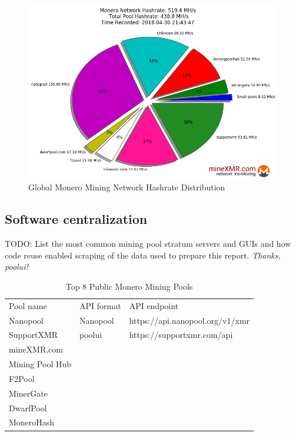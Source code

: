 \documentclass[notitlepage]{report}
\begin{document}
\begin{figure}[h]
\centering
\includegraphics[width=\textwidth]{global-monero-mining-network-hashrate-distribution-2018-04-30}
\captionsetup{labelformat=empty}
\caption{Global Monero Mining Network Hashrate Distribution}
\label{fig:hashrate-distribution}
\end{figure}

\subsection{Software centralization}

TODO: List the most common mining pool stratum servers and GUIs and how code reuse enabled scraping of the data used to prepare this report.  \textit{Thanks, poolui!}


\begin{table}[h]
\centering
\caption{Top 8 Public Monero Mining Pools}
\begin{tabular}{lll}
Pool name       & API format & API endpoint                    \\
Nanopool        & Nanopool   & https://api.nanopool.org/v1/xmr \\
SupportXMR      & poolui     & https://supportxmr.com/api      \\
mineXMR.com     &            &                                 \\
Mining Pool Hub &            &                                 \\
F2Pool          &            &                                 \\
MinerGate       &            &                                 \\
DwarfPool       &            &                                 \\
MoneroHash      &            &                                
\end{tabular}
\label{table:top-8-pools}
\end{table}
\end{document}
